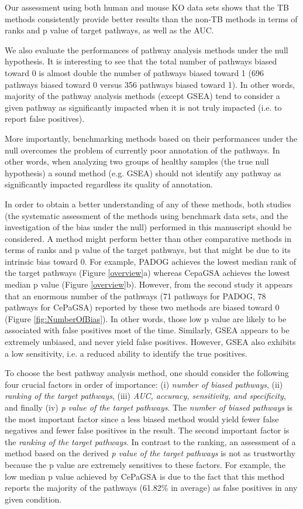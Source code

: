 \documentclass[Minh_PhD_thesis.tex]{subfiles}
\begin{document}
Our assessment using both human and mouse KO data sets shows that the TB methods consistently provide better results than the non-TB methods in terms of ranks and p value of target pathways, as well as the AUC. 

We also evaluate the performances of pathway analysis methods under the null hypothesis.
It is interesting to see that the total number of pathways biased toward 0 is almost double the number of pathways biased toward 1 (696 pathways biased toward 0 versus 356 pathways biased toward 1).
In other words, majority of the pathway analysis methods (except GSEA) tend to consider a given pathway as significantly impacted when it is not truly impacted (i.e. to report false positives). 


More importantly, benchmarking methods based on their performances under the null overcomes the problem of currently poor annotation of the pathways.
In other words, when analyzing two groups of healthy samples (the true null hypothesis) a sound method (e.g. GSEA) should not identify any pathway as significantly impacted regardless its quality of annotation. 

In order to obtain a better understanding of any of these  methods, both studies (the systematic assessment of the methods using benchmark data sets, and the investigation of the bias under the null) performed in this manuscript should be considered.
A method might perform better than other comparative methods in terms of ranks and p value of the target pathways, but that might be due to its intrinsic bias toward 0. 
For example, PADOG achieves the lowest median rank of the target pathways (Figure \ref{overview}a) whereas CepaGSA achieves the lowest median p value (Figure \ref{overview}b).
However, from the second study it appears that an enormous number of the pathways (71 pathways for PADOG, 78 pathways for CePaGSA) reported by these two methods are biased toward 0 (Figure \ref{fig:NumberOfBias}). 
In other words, those low p value are likely to be associated with false positives most of the time. Similarly, GSEA appears to be extremely unbiased, and never yield false positives. However, GSEA  also exhibits a low sensitivity, i.e. a reduced ability to identify the true positives. 

To choose the best pathway analysis method, one should consider the  following four crucial factors in order of importance: (i) \textit{number of biased pathways}, (ii) \textit{ranking of the target pathways}, (iii) \textit{AUC, accuracy, sensitivity, and specificity}, and finally (iv) \textit{p value of the target pathways}. 
The \textit{number of biased pathways} is the most important factor since a less biased method would yield fewer false negatives and fewer false positives in the result.
The second important factor is the \textit{ranking of the target pathways}.
In contrast to the ranking, an assessment of a method based on the derived \textit{p value of the target pathways} is not as trustworthy because the p value are extremely sensitives to these factors. 
For example, the low median p value achieved by CePaGSA is due to the fact that this method reports the majority of the pathways (61.82\% in average) as false positives in any given condition. 
\end{document}
